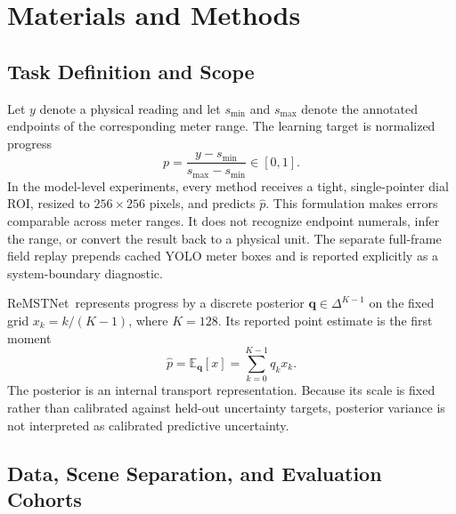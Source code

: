 \documentclass[electronics,article,submit,oneauthor]{Definitions/mdpi}
\newcommand{\modelname}{ReMSTNet}
\begin{document}
\section{Materials and Methods}
\label{sec:methods}

\subsection{Task Definition and Scope}
\label{subsec:task}

Let $y$ denote a physical reading and let $s_{\min}$ and $s_{\max}$ denote the annotated endpoints of the corresponding meter range. The learning target is normalized progress
\begin{equation}
p=\frac{y-s_{\min}}{s_{\max}-s_{\min}}\in[0,1].
\label{eq:normalized_progress}
\end{equation}
In the model-level experiments, every method receives a tight, single-pointer dial ROI, resized to $256\times256$ pixels, and predicts $\hat{p}$. This formulation makes errors comparable across meter ranges. It does not recognize endpoint numerals, infer the range, or convert the result back to a physical unit. The separate full-frame field replay prepends cached YOLO meter boxes and is reported explicitly as a system-boundary diagnostic.

\modelname\ represents progress by a discrete posterior $\mathbf{q}\in\Delta^{K-1}$ on the fixed grid $x_k=k/(K-1)$, where $K=128$. Its reported point estimate is the first moment
\begin{equation}
\hat{p}=\mathbb{E}_{\mathbf{q}}[x]=\sum_{k=0}^{K-1}q_kx_k.
\label{eq:posterior_mean}
\end{equation}
The posterior is an internal transport representation. Because its scale is fixed rather than calibrated against held-out uncertainty targets, posterior variance is not interpreted as calibrated predictive uncertainty.

\subsection{Data, Scene Separation, and Evaluation Cohorts}
\label{subsec:data}
\end{document}
